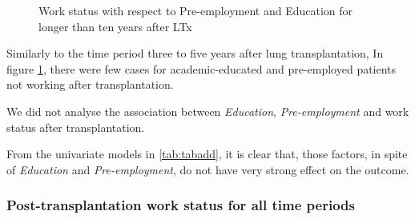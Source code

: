 \documentclass[11pt, a4paper]{article}\usepackage[]{graphicx}\usepackage[]{color}
\newenvironment{knitrout}{}{} %
\begin{document}
{\begin{figure}[ht]
\begin{knitrout}
\end{knitrout}
\caption{Work status with respect to Pre-employment and Education for longer than ten years after LTx}\label{fig10}
\end{figure}


\begin{table}[ht]
\centering
\caption{Univariate models for work status
                 longer than ten years after LTx} 
\label{tab:tabadd}
\end{table}


Similarly to the time period three to five years after lung transplantation, In figure \ref{fig10}, there were few cases for academic-educated and pre-employed patients not working after transplantation. 

We did not analyse the association between \textit{Education}, \textit{Pre-employment} and work status after transplantation. 

From the univariate models in \ref{tab:tabadd}, it is clear that, those factors, in spite of \textit{Education} and \textit{Pre-employment}, do not have very strong effect on the outcome.


\clearpage

\subsubsection*{Post-transplantation work status for all time periods} \label{subsubsec:logis_all}

}
\end{document}
